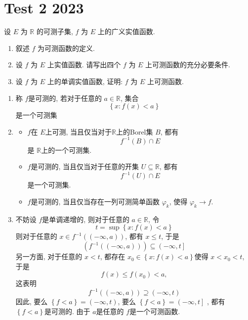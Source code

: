\documentclass[../main.tex]{subfiles}
\begin{document}
\ifSubfilesClassLoaded{

    
}{}

\chapter{ Test 2 2023 }
\begin{exercise}{}{}
设 $E$ 为 $\mathbb{R}$ 的可测子集, $f$ 为 $E$ 上的广义实值函数.
\begin{enumerate}
    \item[(i)] 叙述 $f$ 为可测函数的定义.
    \item[(ii)] 设 $f$ 为 $E$ 上实值函数. 请写出四个 $f$ 为 $E$ 上可测函数的充分必要条件.
    \item[(iii)] 设 $f$ 为 $E$ 上的单调实值函数, 证明: $f$ 为 $E$ 上可测函数.
\end{enumerate}
\end{exercise}
\begin{solution}
    \begin{enumerate}
        \item 称 \(  f  \)是可测的, 若对于任意的 \(  a \in \mathbb{R}   \), 集合 \[
        \left\{ x: f\left( x \right)< a  \right\}
        \]是一个可测集
        \item \begin{itemize}
            \item  \(  f  \)在 \(  E  \)上可测, 当且仅当对于\(  \mathbb{R}   \)上的Borel集 \(  B  \), 都有 \[
        f^{-1} \left( B \right)\cap E 
        \]是 \(  \mathbb{R}   \)上的一个可测集.     
            \item \(  f  \)是可测的, 当且仅当对于任意的开集 \(  U\subseteq \mathbb{R}   \), 都有 \[
            f^{-1} \left( U \right)\cap E 
            \]是一个可测集.
            \item \(  f  \)是可测的, 当且仅当存在一列可测简单函数 \(   \varphi _{k}  \), 使得 \( \varphi _{k}\to f\).     
        \end{itemize}
          \item 不妨设 \(  f  \)是单调递增的, 则对于任意的 \(  a \in \mathbb{R}   \), 令 \[
          t= \sup \left\{ x: f\left( x \right)<   a  \right\}
          \]  则对于任意的 \(  x\in f^{-1} \left( \left( -\infty,a \right)  \right)   \), 都有 \(  x\le t  \), 于是 \[
          \left( f^{-1} \left( \left( -\infty,a \right)  \right)  \right)\subseteq \left( -\infty,t \right]
          \]    另一方面, 对于任意的 \(  x<  t  \), 都存在 \(  x_0\in \left\{ x:f\left( x \right)< a  \right\}  \)使得 \(  x< x_0< t  \), 于是 \[
          f\left( x \right)\le f\left( x_0 \right)< a,   
          \]  这表明 \[
          f^{-1} \left( \left( -\infty,a \right)  \right)\supseteq \left( -\infty,t \right)  
          \]因此, 要么 \(  \left\{ f< a \right\}= \left( -\infty,t \right)   \), 要么 \(  \left\{ f< a \right\}= \left( -\infty,t \right]   \)  , 都有 \(  \left\{ f< a \right\}  \)是可测的. 由于 \(  a  \)是任意的 \(  f  \)是一个可测函数.   
    \end{enumerate}
    
\end{solution}
\end{document}
